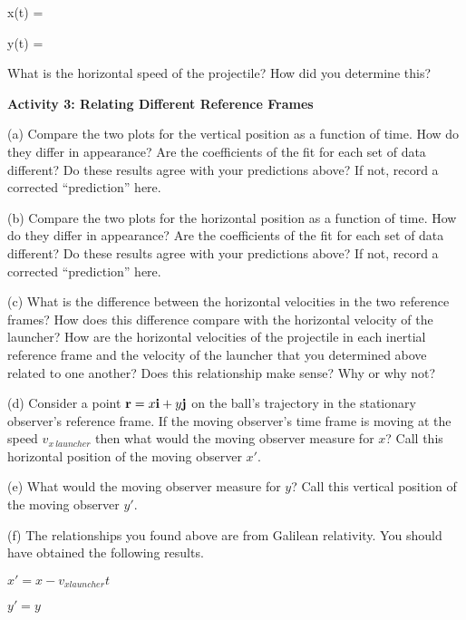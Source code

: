 x(t) =
\vspace{5mm}

y(t) =
\vspace{5mm}

What is the horizontal speed of the projectile? How did you determine
this?
\vspace{60mm}

\textbf{Activity 3: Relating Different Reference Frames}

(a) Compare the two plots for the vertical position as a function
of time. How do they differ in appearance? Are the coefficients of
the fit for each set of data different? Do these results agree with
your predictions above? If not, record a corrected {}``prediction''
here.
\vspace{20mm}

(b) Compare the two plots for the horizontal position as a function
of time. How do they differ in appearance? Are the coefficients of
the fit for each set of data different? Do these results agree with
your predictions above? If not, record a corrected {}``prediction''
here.
\vspace{17mm}

(c) What is the difference between the horizontal velocities in the
two reference frames? How does this difference compare with the horizontal
velocity of the launcher? How are the horizontal velocities of the
projectile in each inertial reference frame and the velocity of the
launcher that you determined above related to one another? Does this
relationship make sense? Why or why not?
\vspace{15mm}

(d) Consider a point ${\bf r} = x{\bf i} + y{\bf j}$ on the
ball's trajectory in the stationary observer's reference frame. If
the moving observer's time frame is moving at the speed \( v_{x\ launcher} \)
then what would the moving observer measure for $x$? Call this horizontal
position of the moving observer $x'$.
\vspace{15mm}

(e) What would the moving observer measure for $y$? Call this vertical
position of the moving observer $y'$.
\vspace{15mm}

(f) The relationships you found above are from Galilean relativity. You
should have obtained the following results.

{\centering \( x'=x-v_{xlauncher}t \)\par}

{\centering \( y'=y \)\par}

